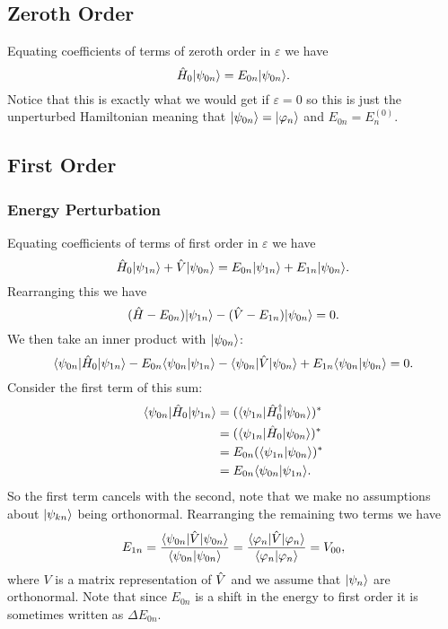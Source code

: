 \subsection{Zeroth Order}
Equating coefficients of terms of zeroth order in \(\varepsilon\) we have
\[\hat{H}_0\vert {\psi_{0n}} \rangle = E_{0n}\vert {\psi_{0n}} \rangle.\]
Notice that this is exactly what we would get if \(\varepsilon = 0\) so this is just the unperturbed Hamiltonian meaning that \(\vert {\psi_{0n}} \rangle = \vert {\varphi_n} \rangle\) and \(E_{0n} = E_n^{(0)}\).

\subsection{First Order}
\subsubsection{Energy Perturbation}
Equating coefficients of terms of first order in \(\varepsilon\) we have
\[\hat{H}_0\vert {\psi_{1n}} \rangle + \hat{V}\vert {\psi_{0n}} \rangle = E_{0n}\vert {\psi_{1n}} \rangle + E_{1n}\vert {\psi_{0n}} \rangle.\]
Rearranging this we have
\begin{equation}\label{eqn:perturbation theory first order terms}
    (\hat{H} - E_{0n})\vert {\psi_{1n}} \rangle - (\hat{V} - E_{1n})\vert {\psi_{0n}} \rangle = 0.
\end{equation}
We then take an inner product with \(\vert {\psi_{0n}} \rangle\):
\[\langle {\psi_{0n}} \vert\hat{H}_0\vert {\psi_{1n}} \rangle - E_{0n}\langle {\psi_{0n}} \vert {\psi_{1n}} \rangle - \langle {\psi_{0n}} \vert\hat{V}\vert {\psi_{0n}} \rangle + E_{1n}\langle {\psi_{0n}} \vert {\psi_{0n}} \rangle = 0.\]
Consider the first term of this sum:
\begin{align*}
    \langle {\psi_{0n}} \vert\hat{H}_0\vert {\psi_{1n}} \rangle &= (\langle {\psi_{1n}} \vert\hat{H}_0^\dagger\vert {\psi_{0n}} \rangle)^*\\
    &= (\langle {\psi_{1n}} \vert\hat{H}_0\vert {\psi_{0n}} \rangle)^*\\
    &= E_{0n}(\langle {\psi_{1n}} \vert {\psi_{0n}} \rangle)^*\\
    &= E_{0n}\langle {\psi_{0n}} \vert {\psi_{1n}} \rangle.
\end{align*}
So the first term cancels with the second, note that we make no assumptions about \(\vert {\psi_{kn}} \rangle\) being orthonormal.
Rearranging the remaining two terms we have
\[E_{1n} = \frac{\langle {\psi_{0n}} \vert\hat{V}\vert {\psi_{0n}} \rangle}{\langle {\psi_{0n}} \vert {\psi_{0n}} \rangle} = \frac{\langle {\varphi_n} \vert\hat{V}\vert {\varphi_n} \rangle}{\langle {\varphi_n} \vert {\varphi_n} \rangle} = V_{00},\]
where \(V\) is a matrix representation of \(\hat{V}\) and we assume that \(\vert {\psi_n} \rangle\) are orthonormal.
Note that since \(E_{0n}\) is a shift in the energy to first order it is sometimes written as \(\Delta E_{0n}\).

